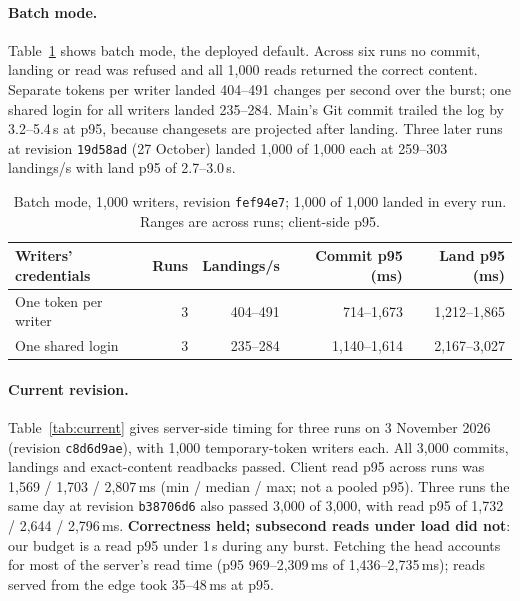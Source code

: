 \documentclass[11pt]{article}
\newcommand{\code}[1]{\texttt{#1}}
\begin{document}
\paragraph{Batch mode.} Table~\ref{tab:batch} shows batch mode, the deployed default.
Across six runs no commit, landing or read was refused and all 1,000 reads returned the
correct content. Separate tokens per writer landed 404--491 changes per second over the
burst; one shared login for all writers landed 235--284.
Main's Git commit trailed the log by 3.2--5.4\,s at p95, because changesets are
projected after landing. Three later runs at revision \code{19d58ad} (27 October)
landed 1,000 of 1,000 each at 259--303 landings/s with land p95 of 2.7--3.0\,s.

\begin{table}[t]
\centering
\small
\begin{tabular}{@{}lrrrr@{}}
\toprule
Writers' credentials & Runs & Landings/s & Commit p95 (ms) & Land p95 (ms) \\
\midrule
One token per writer & 3 & 404--491 & 714--1,673 & 1,212--1,865 \\
One shared login & 3 & 235--284 & 1,140--1,614 & 2,167--3,027 \\
\bottomrule
\end{tabular}
\caption{Batch mode, 1,000 writers, revision \code{fef94e7}; 1,000 of 1,000 landed in
every run. Ranges are across runs; client-side p95.}
\label{tab:batch}
\end{table}

\paragraph{Current revision.} Table~\ref{tab:current} gives server-side timing for three
runs on 3 November 2026 (revision \code{c8d6d9ae}), with 1,000 temporary-token writers
each. All 3,000 commits, landings and exact-content readbacks passed. Client read p95
across runs was 1,569 / 1,703 / 2,807\,ms (min / median / max; not a pooled p95). Three
runs the same day at revision \code{b38706d6} also passed 3,000 of 3,000, with read p95
of 1,732 / 2,644 / 2,796\,ms. \textbf{Correctness held; subsecond reads under load did
not}: our budget is a read p95 under 1\,s during any burst. Fetching the head
accounts for most of the server's read time (p95 969--2,309\,ms of 1,436--2,735\,ms);
reads served from the edge took 35--48\,ms at p95.
\end{document}
